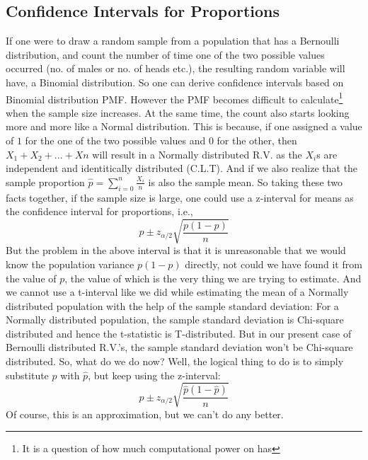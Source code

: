 \subsection{Confidence Intervals for Proportions}
If one were to draw a random sample from a population that has a Bernoulli distribution, and count the number of time one of the two possible values occurred (no. of males or no. of heads etc.), the resulting random variable will have, a Binomial distribution. So one can derive confidence intervals based on Binomial distribution PMF. However the PMF becomes difficult to calculate\footnote{It is a question of how much computational power on has} when the sample size increases. At the same time, the count also starts looking more and more like a Normal distribution. This is because, if one assigned a value of $1$ for the one of the two possible values and $0$ for the other, then \( X_1+X_2+...+Xn \) will result in a Normally distributed R.V. as the $X_i$s are independent and identitically distributed (C.L.T). And if we also realize that the sample proportion $ \hat{p} = \sum_{i=0}^{n}\frac{ X_i}{n} $ is also the sample mean. So taking these two facts together, if the sample size is large, one could use a z-interval for means as the confidence interval for proportions, i.e., 
	\[ \hat{p}\pm z_{\alpha/2}\sqrt{\dfrac{p(1-p)}{n}} \]
But the problem in the above interval is that it is unreasonable that we would know the population variance $ p(1-p) $ directly, not could we have found it from the value of $p$, the value of which is the very thing we are trying to estimate. And we cannot use a t-interval like we did while estimating the mean of a Normally distributed population with the help of the sample standard deviation: For a Normally distributed population, the sample standard deviation is Chi-square distributed and hence the t-statistic is T-distributed. But in our present case of Bernoulli distributed R.V.'s, the sample standard deviation won't be Chi-square distributed. So, what do we do now? Well, the logical thing to do is to simply substitute $p$ with $\hat{p}$, but keep using the z-interval: 
	\[ \hat{p}\pm z_{\alpha/2}\sqrt{\dfrac{\hat{p}(1-\hat{p})}{n}} \]
Of course, this is an approximation, but we can't do any better.

